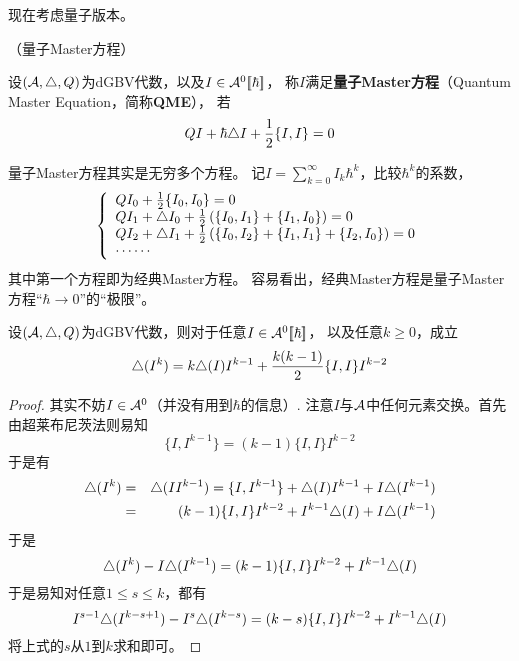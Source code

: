 


现在考虑量子版本。

\begin{definition}（量子Master方程）

设$(\mathcal{A},\triangle,Q)$为dGBV代数，以及$I\in\mathcal{A}^0[\![\hbar]\!]$，
称$I$满足\textbf{量子Master方程}（Quantum Master Equation，简称\textbf{QME}），
若
$$QI+\hbar\triangle I+\frac{1}{2}\{I,I\}=0$$
\end{definition}
量子Master方程其实是无穷多个方程。
记$I=\sum\limits_{k=0}^\infty I_k\hbar^k$，比较$\hbar^k$的系数，
$$
  \left\{
    \begin{array}{l}
      QI_0+\frac{1}{2}\{I_0,I_0\}=0\\
      QI_1+\triangle I_0+\frac{1}{2}
        \left(
          \{I_0,I_1\}+\{I_1,I_0\}
        \right)=0\\
      QI_2+\triangle I_1+\frac{1}{2}
        \left(
          \{I_0,I_2\}+\{I_1,I_1\}+\{I_2,I_0\}
        \right)=0\\
      \cdots\cdots
    \end{array}
  \right.
$$
其中第一个方程即为经典Master方程。
容易看出，经典Master方程是量子Master方程“$\hbar\to 0$”的“极限”。

\begin{lemma}
设$(\mathcal{A},\triangle,Q)$为dGBV代数，则对于任意$I\in\mathcal{A}^0[\![\hbar]\!]$，
以及任意$k\geq 0$，成立
$$\triangle(I^k)=k\triangle(I)I^{k-1}+\frac{k(k-1)}{2}\{I,I\}I^{k-2}$$
\end{lemma}

\begin{proof}
其实不妨$I\in\mathcal{A}^0$（并没有用到$\hbar$的信息）.
注意$I$与$\mathcal{A}$中任何元素交换。首先由超莱布尼茨法则易知
$$\{I,I^{k-1}\}=(k-1)\{I,I\}I^{k-2}$$
于是有
\begin{eqnarray*}
     \triangle(I^k)&=&\triangle(II^{k-1})
 =
     \{I,I^{k-1}\}+\triangle(I)I^{k-1}
    +I\triangle(I^{k-1})\\
&=&
     (k-1)\{I,I\}I^{k-2}
    +I^{k-1}\triangle(I)
    +I\triangle(I^{k-1})
\end{eqnarray*}
于是
$$\triangle(I^k)-I\triangle(I^{k-1})=(k-1)\{I,I\}I^{k-2}+I^{k-1}\triangle(I)$$
于是易知对任意$1\leq s\leq k$，都有
$$I^{s-1}\triangle(I^{k-s+1})-I^s\triangle(I^{k-s})
=(k-s)\{I,I\}I^{k-2}+I^{k-1}\triangle(I)$$
将上式的$s$从$1$到$k$求和即可。
\end{proof}

